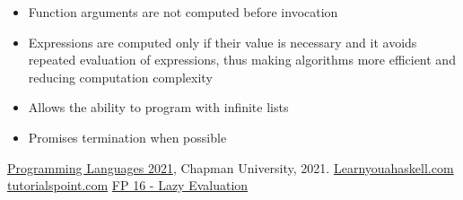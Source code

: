 \documentclass{article}
\begin{document}
\begin{itemize}
    \item Function arguments are not computed before invocation
    \item Expressions are computed only if their value is necessary and it avoids repeated evaluation of expressions, thus making algorithms more efficient and reducing computation complexity
    \item Allows the ability to program with infinite lists
    \item Promises termination when possible  

\end{itemize}
\begin{thebibliography}{99}
 \href{https://github.com/alexhkurz/programming-languages-2021/blob/main/README.md}{Programming Languages 2021}, Chapman University, 2021.
 \href{http://learnyouahaskell.com/chapters}{Learnyouahaskell.com}
 \href{https://www.tutorialspoint.com/haskell/haskell_types_and_type_class.htm}{tutorialspoint.com}
 \href{https://www.youtube.com/watch?v=R1uBhRK2AKI}{FP 16 - Lazy Evaluation}
\end{thebibliography}
\end{document}
